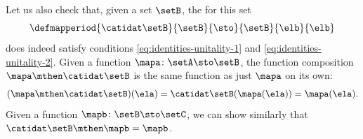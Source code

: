 \begin{example}
    Let us also check that, given a set $\setB$, the  for this set 
    \begin{equation}
        \defmapperiod{
            \catidat\setB
        }{
            \setB
        }{
            \sto
        }{
            \setB
        }{
            \elb
        }{
            \elb
        }
    \end{equation}
    does indeed satisfy conditions \cref{eq:identities-unitality-1} and \cref{eq:identities-unitality-2}.
    Given a function $\mapa \colon \setA \sto \setB$, the function composition $\mapa \mthen \catidat\setB$ is the same function as just $\mapa$ on its own:
    \begin{equation}
        (\mapa \mthen \catidat\setB)(\ela)
        = \catidat\setB(\mapa (\ela)) = \mapa (\ela).
    \end{equation}
    Given a function $\mapb \colon \setB \sto \setC$, we can show similarly that $\catidat\setB \mthen \mapb = \mapb$.
\end{example}

